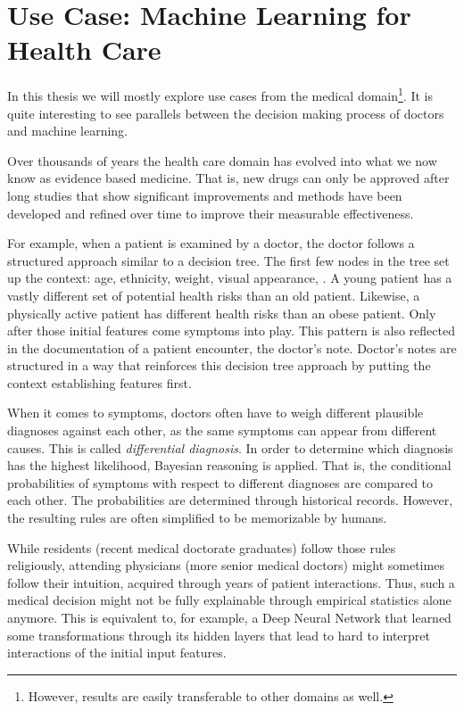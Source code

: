 \section{Use Case: Machine Learning for Health Care}
In this thesis we will mostly explore use cases from the medical domain\footnote{However, results are easily transferable to other domains as well.}.
It is quite interesting to see parallels between the decision making process of doctors and machine learning.

Over thousands of years the health care domain has evolved into what we now know as evidence based medicine.
That is, new drugs can only be approved after long studies that show significant improvements and methods have been developed and refined over time to improve their measurable effectiveness.

For example, when a patient is examined by a doctor, the doctor follows a structured approach similar to a decision tree.
The first few nodes in the tree set up the context: age, ethnicity, weight, visual appearance, \etc.
A young patient has a vastly different set of potential health risks than an old patient.
Likewise, a physically active patient has different health risks than an obese patient.
Only after those initial features come symptoms into play.
This pattern is also reflected in the documentation of a patient encounter, the doctor's note.
Doctor's notes are structured in a way that reinforces this decision tree approach by putting the context establishing features first.

When it comes to symptoms, doctors often have to weigh different plausible diagnoses against each other, as the same symptoms can appear from different causes.
This is called \emph{differential diagnosis}.
In order to determine which diagnosis has the highest likelihood, Bayesian reasoning is applied.
That is, the conditional probabilities of symptoms with respect to different diagnoses are compared to each other.
The probabilities are determined through historical records.
However, the resulting rules are often simplified to be memorizable by humans.

While residents (recent medical doctorate graduates) follow those rules religiously, attending physicians (more senior medical doctors) might sometimes follow their intuition, acquired through years of patient interactions.
Thus, such a medical decision might not be fully explainable through empirical statistics alone anymore.
This is equivalent to, for example, a Deep Neural Network that learned some transformations through its hidden layers that lead to hard to interpret interactions of the initial input features.
